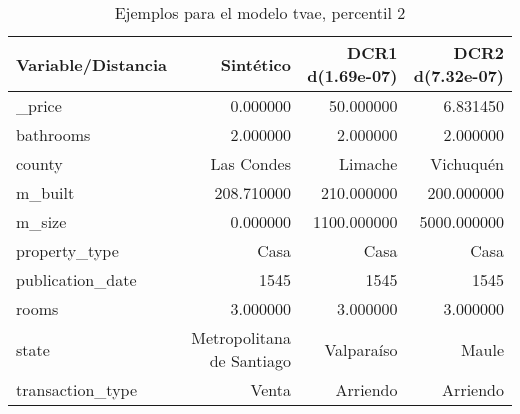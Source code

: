 \begin{table}[H]
\centering
\fontsize{10}{14}\selectfont
\caption{Ejemplos para el modelo tvae, percentil 2}
\label{table-example-economicos-a-2-tvae-2p}
\begin{tabular}{|l|r|r|r|}
\hline
\rowcolor[gray]{0.8}
Variable/Distancia & Sintético & DCR1 d(1.69e-07) & DCR2 d(7.32e-07) \\
\hline \_price & \cellcolor[rgb]{0.9, 0.54, 0.52} 0.000000 & 50.000000 & 6.831450 \\
\hline bathrooms & \cellcolor[rgb]{0.9, 0.54, 0.52} 2.000000 & \cellcolor[rgb]{0.9, 0.54, 0.52} 2.000000 & \cellcolor[rgb]{0.9, 0.54, 0.52} 2.000000 \\
\hline county & \cellcolor[rgb]{0.9, 0.54, 0.52} Las Condes & Limache & Vichuquén \\
\hline m\_built & \cellcolor[rgb]{0.9, 0.54, 0.52} 208.710000 & 210.000000 & 200.000000 \\
\hline m\_size & \cellcolor[rgb]{0.9, 0.54, 0.52} 0.000000 & 1100.000000 & 5000.000000 \\
\hline property\_type & \cellcolor[rgb]{0.9, 0.54, 0.52} Casa & \cellcolor[rgb]{0.9, 0.54, 0.52} Casa & \cellcolor[rgb]{0.9, 0.54, 0.52} Casa \\
\hline publication\_date & \cellcolor[rgb]{0.9, 0.54, 0.52} 1545 & \cellcolor[rgb]{0.9, 0.54, 0.52} 1545 & \cellcolor[rgb]{0.9, 0.54, 0.52} 1545 \\
\hline rooms & \cellcolor[rgb]{0.9, 0.54, 0.52} 3.000000 & \cellcolor[rgb]{0.9, 0.54, 0.52} 3.000000 & \cellcolor[rgb]{0.9, 0.54, 0.52} 3.000000 \\
\hline state & \cellcolor[rgb]{0.9, 0.54, 0.52} Metropolitana de Santiago & Valparaíso & Maule \\
\hline transaction\_type & \cellcolor[rgb]{0.9, 0.54, 0.52} Venta & Arriendo & Arriendo \\
\hline
\end{tabular}
\end{table}
